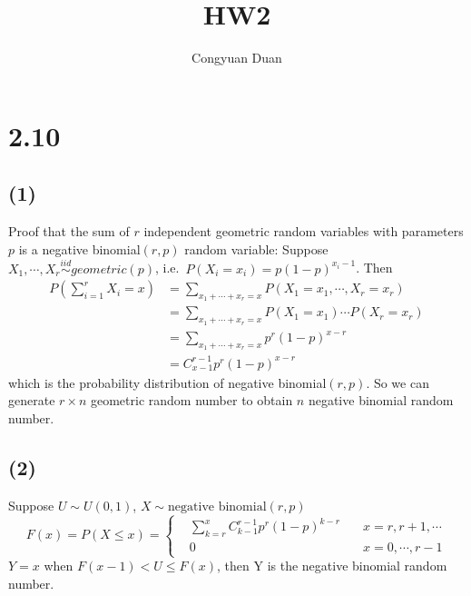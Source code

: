 \documentclass[11pt]{article}
\author{Congyuan Duan}
\title{HW2}
\begin{document}
    
    \maketitle
    
    

    
    \hypertarget{section}{%
\section{2.10}\label{section}}

    \hypertarget{section}{%
\subsection{(1)}\label{section}}

    Proof that the sum of \(r\) independent geometric random variables with
parameters \(p\) is a negative binomial\((r,p)\) random variable:
Suppose \(X_1,\cdots,X_r\overset{iid}\sim geometric(p)\),
i.e.~\(P(X_i=x_i)=p(1-p)^{x_i-1}\). Then \[\begin{align}
    P(\sum_{i=1}^r X_i=x)&= \sum_{x_1+\cdots+x_r=x} P(X_1=x_1,\cdots,X_r=x_r) \\
    &= \sum_{x_1+\cdots+x_r=x} P(X_1=x_1)\cdots P(X_r=x_r) \\
    &= \sum_{x_1+\cdots+x_r=x} p^r (1-p)^{x-r} \\
    &= C_{x-1}^{r-1} p^r (1-p)^{x-r}
\end{align}\] which is the probability distribution of negative
binomial\((r,p)\). So we can generate \(r\times n\) geometric random
number to obtain \(n\) negative binomial random number.

    \hypertarget{section}{%
\subsection{(2)}\label{section}}

    Suppose \(U\sim U(0,1)\), \(X\sim \text{negative binomial}(r,p)\)
\[F(x)=P(X\leq x)= \left\{ 
\begin{align}
&\sum_{k=r}^x C_{k-1}^{r-1} p^r (1-p)^{k-r}\quad &x=r,r+1,\cdots \\
&0\quad &x=0,\cdots, r-1
\end{align}    
\right.
\] \(Y=x\) when \(F(x-1)<U\leq F(x)\), then Y is the negative binomial
random number.
\end{document}
